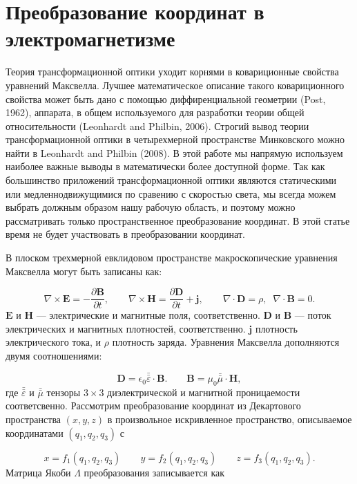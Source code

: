 \documentclass[12pt,a4paper]{article}
\begin{document}
\section{Преобразование координат в электромагнетизме}
Теория трансформационной оптики уходит корнями в ковариционные свойства уравнений Максвелла. 
Лучшее математическое описание такого ковариционного свойства может быть дано с помощью диффиренциальной
геометрии (Post, 1962), аппарата, в общем используемого для разработки теории общей относительности
(Leonhardt and Philbin, 2006). Строгий вывод теории трансформационной оптики в четырехмерной пространстве
Минковского можно найти в Leonhardt and Philbin (2008). В этой работе мы напрямую используем наиболее
важные выводы в математически более доступной форме. Так как большинство приложений трансформационной 
оптики являются статическими или медленнодвижущимися по сравению с скоростью света, мы всегда можем
выбрать должным образом нашу рабочую область, и поэтому можно рассматривать только пространственное 
преобразование координат. В этой статье время не будет участвовать в преобразовании координат.

В плоском трехмерной евклидовом пространстве макроскопические уравнения Максвелла могут быть записаны как:

\begin{equation}\label{e1}
	\nabla \times \mathbf{E} = - \frac{\partial \mathbf{B}}{\partial t}, \qquad
	\nabla \times \mathbf{H} = \frac{\partial \mathbf{D}}{\partial t} + \mathbf{j}, \qquad
	\nabla \cdot \mathbf{D} = \rho, \;\;
	\nabla \cdot \mathbf{B} = 0.
\end{equation}
$\mathbf{E}$ и $\mathbf{H}$ --- электрические и магнитные поля, соответственно. $\mathbf{D}$ и 
$\mathbf{B}$ --- поток электрических и магнитных плотностей, соответственно. $\mathbf{j}$ плотность 
электрического тока, и $\rho$ плотность заряда. Уравнения Максвелла дополняются двумя соотношениями:

\begin{equation}\label{e2}
	\mathbf{D} = \epsilon_0 \bar{\bar{\varepsilon}} \cdot \mathbf{B}. \qquad
	\mathbf{B} = \mu_0 \bar{\bar{\mu}} \cdot \mathbf{H},
\end{equation}
где $\bar{\bar{\varepsilon}}$ и $\bar{\bar{\mu}}$ тензоры $3 \times 3$ диэлектрической и магнитной 
проницаемости соответсвенно. Рассмотрим преобразование координат из Декартового пространства 
$(x, y, z)$ в произвольное искривленное пространство, описываемое координатами $(q_1, q_2, q_3)$ с

\begin{equation}\label{e3}
	x = f_1(q_1, q_2, q_3) \qquad y = f_2(q_1, q_2, q_3) \qquad z = f_3(q_1, q_2, q_3).
\end{equation}
Матрица Якоби $\Lambda$ преобразования записывается как 
\end{document}
